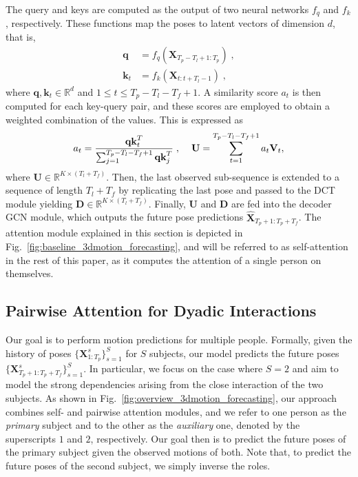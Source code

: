 The query and keys are computed as the output of two neural networks $f_q$ and $f_k$, respectively. These functions map the poses to latent vectors of dimension $d$, that is, 
\begin{align}
	\textbf{q} &= f_q(\textbf{X}_{{T}_p-{T}_l+1:{T}_p}) \; , \label{eq:query_computation}\\
	\textbf{k}_{t} &= f_k(\textbf{X}_{t:t+{T}_l-1}) \; , \label{eq:key_computation}
\end{align}
where $\textbf{q}, \textbf{k}_{t} \in \mathbb{R}^d$ and $1 \leq t \leq {T}_p-{T}_l-{T}_f+1$.
A similarity score $a_{t}$ is then computed for each key-query pair, and these scores are employed to obtain a weighted combination of the values. This is expressed as
\begin{align}
	a_{t} = \frac{\textbf{q}\textbf{k}_{t}^T}{\sum_{j=1}^{{T}_p-{T}_l-{T}_f+1}\textbf{q}\textbf{k}_{j}^T} \; , \hspace{4mm}
	\textbf{U} = \sum_{t=1}^{{T}_p-{T}_l-{T}_f+1}a_{t} \textbf{V}_{t}, \label{eq:self_att}
\end{align}
where $\textbf{U} \in \mathbb{R}^{K \times ({T}_l+{T}_f)}$.
Then, the last observed sub-sequence is extended to a sequence of length ${T}_l+{T}_f$ by replicating the last pose and passed to the DCT module yielding $\textbf{D} \in \mathbb{R}^{K \times ({T}_l+{T}_f)}$. Finally, $\textbf{U}$ and $\textbf{D}$ are fed into the decoder GCN module, which outputs the future pose predictions $\hat{\textbf{X}}_{{T}_p+1:{T}_p+{T}_f}$. The attention module explained in this section is depicted in Fig.~\ref{fig:baseline_3dmotion_forecasting}, and will be referred to as self-attention in the rest of this paper, as it computes the attention of a single person on themselves.

\subsection{Pairwise Attention for Dyadic Interactions}



Our goal is to perform motion predictions for multiple people. Formally, given the history of poses $\{\textbf{X}^{s}_{1:{T}_p}\}_{s=1}^{S}$ for $S$ subjects, our model predicts the future poses $\{\textbf{X}^{s}_{{T}_p+1:{T}_p+{T}_f}\}_{s=1}^{S}$. In particular, we focus on the case where $S = 2$ and aim to model the strong dependencies arising from the close interaction of the two subjects. As shown in Fig.~\ref{fig:overview_3dmotion_forecasting}, our approach combines self- and pairwise attention modules, and we refer to one person as the \emph{primary} subject and to the other as the \emph{auxiliary} one, denoted by the superscripts $1$ and $2$, respectively. Our goal then is to predict the future poses of the primary subject given the observed motions of both. Note that, to predict the future poses of the second subject, we simply inverse the roles.

